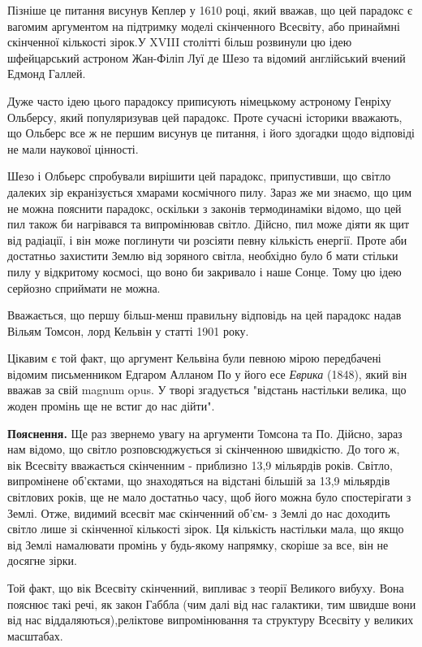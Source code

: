 \documentclass[a4paper]{article}
\begin{document}
Пізніше це питання висунув Кеплер у 1610 році, який вважав, що цей парадокс є вагомим аргументом на підтримку моделі скінченного Всесвіту, або принаймні скінченної кількості зірок.У XVIII столітті більш розвинули цю ідею шфейцарський астроном Жан-Філіп Луї де Шезо та відомий англійський вчений Едмонд Галлей.

Дуже часто ідею цього парадоксу приписують німецькому астроному Генріху Ольберсу, який популяризував цей парадокс. Проте сучасні історики вважають, що Ольберс все ж не першим висунув це питання, і його здогадки щодо відповіді не мали наукової цінності.\cite{essential}

Шезо і Олбьерс спробували вирішити цей парадокс, припустивши, що світло далеких зір екранізується хмарами космічного пилу. Зараз же ми знаємо, що цим не можна пояснити парадокс, оскільки з законів термодинаміки відомо, що цей пил також би нагрівався та випромінював світло. Дійсно, пил може діяти як щит від радіації, і він може поглинути чи розсіяти певну кількість енергії. Проте аби достатньо захистити Землю від зоряного світла, необхідно було б мати стільки пилу у відкритому космосі, що воно би закривало і наше Сонце. Тому цю ідею серйозно сприймати не можна. \cite{relativityFAQ}

Вважається, що першу більш-менш правильну відповідь на цей парадокс надав Вільям Томсон, лорд Кельвін у статті 1901 року.

Цікавим є той факт, що аргумент Кельвіна були певною мірою передбачені відомим письменником Едгаром Алланом По у його есе \textit{Еврика} (1848), який він вважав за свій magnum opus. У творі згадується "відстань настільки велика, що жоден промінь ще не встиг до нас дійти". \cite{nyt}

\textbf{Пояснення.}
Ще раз звернемо увагу на аргументи Томсона та По. Дійсно, зараз нам відомо, що світло розповсюджується зі скінченною швидкістю. До того ж, вік Всесвіту вважається скінченним - приблизно 13,9 мільярдів років. Світло, випромінене об'єктами, що знаходяться на відстані більшій за 13,9 мільярдів світлових років, ще не мало достатньо часу, щоб його можна було спостерігати з Землі. Отже, видимий всесвіт має скінченний об'єм- з Землі до нас доходить світло лише зі скінченної кількості зірок. Ця кількість настільки мала, що якщо від Землі намалювати промінь у будь-якому напрямку, скоріше за все, він не досягне зірки.

Той факт, що вік Всесвіту скінченний, випливає з теорії Великого вибуху. Вона пояснює такі речі, як закон Габбла (чим далі від нас галактики, тим швидше вони від нас віддаляються),реліктове випромінювання та структуру Всесвіту у великих масштабах. \cite{introduction}
\end{document}
